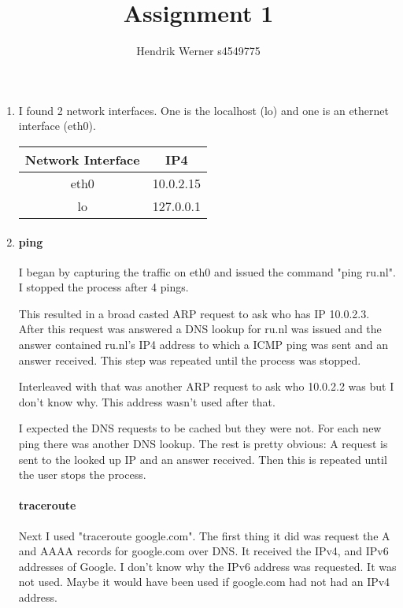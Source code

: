 \documentclass[12pt, a4paper]{article}
\title{Assignment 1}
\author{Hendrik Werner s4549775}
\begin{document}
\maketitle

\section{} %
\begin{enumerate}[a]
	\item %
	\begin{multicols}{2}
		I found 2 network interfaces. One is the localhost (lo) and one is an ethernet interface (eth0).

		\begin{tabular}{c|c}
			Network Interface & IP4\\\hline
			eth0 & 10.0.2.15\\
			lo & 127.0.0.1\\
		\end{tabular}
	\end{multicols}

	\item %
	\paragraph{ping}
	I began by capturing the traffic on eth0 and issued the command "ping ru.nl". I stopped the process after 4 pings.

	This resulted in a broad casted ARP request to ask who has IP 10.0.2.3. After this request was answered a DNS lookup for ru.nl was issued and the answer contained ru.nl's IP4 address to which a ICMP ping was sent and an answer received. This step was repeated until the process was stopped.

	Interleaved with that was another ARP request to ask who 10.0.2.2 was but I don't know why. This address wasn't used after that.

	I expected the DNS requests to be cached but they were not. For each new ping there was another DNS lookup. The rest is pretty obvious: A request is sent to the looked up IP and an answer received. Then this is repeated until the user stops the process.

	\paragraph{traceroute}
	Next I used "traceroute google.com". The first thing it did was request the A and AAAA records for google.com over DNS. It received the IPv4, and IPv6 addresses of Google. I don't know why the IPv6 address was requested. It was not used. Maybe it would have been used if google.com had not had an IPv4 address.


\end{enumerate}
\end{document}
